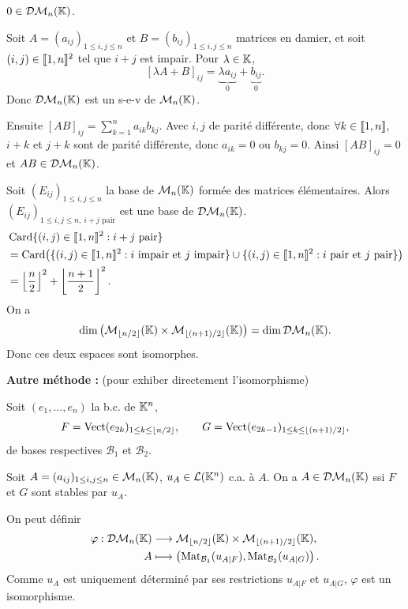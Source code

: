 \begin{solution}
$0\in\mathcal{DM}_n(\mathbb K)$.

Soit $A=(a_{ij})_{1\leq i,j\leq n}$ et $B=(b_{ij})_{1\leq i,j\leq n}$ matrices en damier,
et soit $(i,j)\in\llbracket 1,n\rrbracket^2$ tel que $i+j$ est impair. Pour $\lambda\in\mathbb K$,
\[
[\lambda A+B]_{ij}=\underbrace{\lambda a_{ij}}_{0}+\underbrace{b_{ij}}_{0}.
\]
Donc $\mathcal{DM}_n(\mathbb K)$ est un s-e-v de $\mathcal M_n(\mathbb K)$.

Ensuite $[AB]_{ij}=\sum_{k=1}^na_{ik}b_{kj}$. Avec $i,j$ de parité différente, donc
$\forall k\in\llbracket 1,n\rrbracket$, $i+k$ et $j+k$ sont de parité différente, donc
$a_{ik}=0$ ou $b_{kj}=0$. Ainsi $[AB]_{ij}=0$ et $AB\in\mathcal{DM}_n(\mathbb K)$.

Soit $(E_{ij})_{1\leq i,j\leq n}$ la base de $\mathcal M_n(\mathbb K)$ formée des matrices élémentaires.
Alors $(E_{ij})_{1\leq i,j\leq n,\ i+j\text{ pair}}$ est une base de $\mathcal{DM}_n(\mathbb K)$.
\begin{align*}
&\operatorname{Card}\{(i,j)\in\llbracket 1,n\rrbracket^2:i+j\text{ pair}\}\\
&=\operatorname{Card}\bigl(
\{(i,j)\in\llbracket 1,n\rrbracket^2:i\text{ impair et }j\text{ impair}\}
\cup\{(i,j)\in\llbracket 1,n\rrbracket^2:i\text{ pair et }j\text{ pair}\}\bigr)\\
&=\left\lfloor\frac n2\right\rfloor^2+\left\lfloor\frac{n+1}{2}\right\rfloor^2.
\end{align*}
On a
\[
\dim\left(\mathcal M_{\lfloor n/2\rfloor}(\mathbb K)\times
\mathcal M_{\lfloor(n+1)/2\rfloor}(\mathbb K)\right)=\dim\mathcal{DM}_n(\mathbb K).
\]
Donc ces deux espaces sont isomorphes.

\begin{remarkbox}
\textbf{Autre méthode :} (pour exhiber directement l'isomorphisme)

Soit $(e_1,\ldots,e_n)$ la b.c. de $\mathbb K^n$,
\[
F=\operatorname{Vect}(e_{2k})_{1\leq k\leq\lfloor n/2\rfloor},\qquad
G=\operatorname{Vect}(e_{2k-1})_{1\leq k\leq\lfloor(n+1)/2\rfloor},
\]
de bases respectives $\mathcal B_1$ et $\mathcal B_2$.

Soit $A=(a_{ij})_{1\leq i,j\leq n}\in\mathcal M_n(\mathbb K)$, $u_A\in\mathcal L(\mathbb K^n)$ c.a. à $A$.
On a $A\in\mathcal{DM}_n(\mathbb K)$ ssi $F$ et $G$ sont stables par $u_A$.

On peut définir
\[
\begin{aligned}
\varphi:\mathcal{DM}_n(\mathbb K)&\longrightarrow
\mathcal M_{\lfloor n/2\rfloor}(\mathbb K)\times\mathcal M_{\lfloor(n+1)/2\rfloor}(\mathbb K),\\
A&\longmapsto\left(\operatorname{Mat}_{\mathcal B_1}(u_{A|F}),
\operatorname{Mat}_{\mathcal B_2}(u_{A|G})\right).
\end{aligned}
\]
Comme $u_A$ est uniquement déterminé par ses restrictions $u_{A|F}$ et $u_{A|G}$,
$\varphi$ est un isomorphisme.
\end{remarkbox}


\end{solution}
